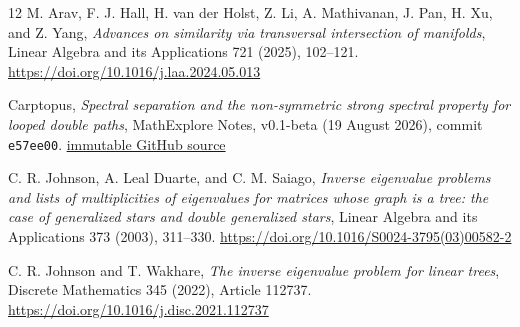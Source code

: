 \documentclass[11pt]{article}
\theoremstyle{remark}
\begin{document}
\begin{thebibliography}{12}
 M. Arav, F. J. Hall, H. van der Holst, Z. Li, A. Mathivanan,
J. Pan, H. Xu, and Z. Yang,
\emph{Advances on similarity via transversal intersection of manifolds},
Linear Algebra and its Applications 721 (2025), 102--121.
\url{https://doi.org/10.1016/j.laa.2024.05.013}

 Carptopus,
\emph{Spectral separation and the non-symmetric strong spectral property for looped double paths},
MathExplore Notes, v0.1-beta (19 August 2026), commit \texttt{e57ee00}.
\href{https://github.com/Carptopus/MathExplore-Notes/tree/e57ee007380cbc351eb371d8e991303cab5f1e48/research/nssp-looped-double-paths}{immutable GitHub source}

 C. R. Johnson, A. Leal Duarte, and C. M. Saiago,
\emph{Inverse eigenvalue problems and lists of multiplicities of eigenvalues for matrices whose graph is a tree: the case of generalized stars and double generalized stars},
Linear Algebra and its Applications 373 (2003), 311--330.
\url{https://doi.org/10.1016/S0024-3795(03)00582-2}

 C. R. Johnson and T. Wakhare,
\emph{The inverse eigenvalue problem for linear trees},
Discrete Mathematics 345 (2022), Article 112737.
\url{https://doi.org/10.1016/j.disc.2021.112737}

\end{thebibliography}
\end{document}
